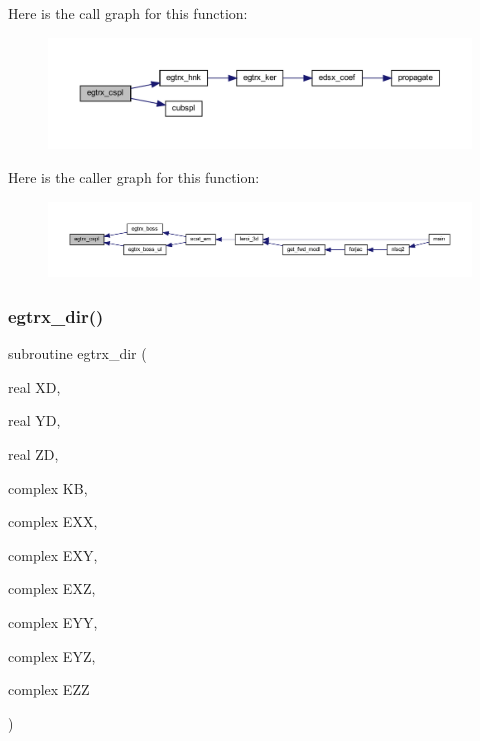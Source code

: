 Here is the call graph for this function\+:\nopagebreak
\begin{figure}[H]
\begin{center}
\leavevmode
\includegraphics[width=350pt]{Leroi_8f90_a10fd9ada0ec15151a8112666c09a245d_cgraph}
\end{center}
\end{figure}
Here is the caller graph for this function\+:\nopagebreak
\begin{figure}[H]
\begin{center}
\leavevmode
\includegraphics[width=350pt]{Leroi_8f90_a10fd9ada0ec15151a8112666c09a245d_icgraph}
\end{center}
\end{figure}
\mbox{\label{Leroi_8f90_a6bbebe0c58cc288fcd56628de8860916}} 
\subsubsection{\texorpdfstring{egtrx\+\_\+dir()}{egtrx\_dir()}}
{\footnotesize\ttfamily subroutine egtrx\+\_\+dir (\begin{DoxyParamCaption}\item[{real}]{XD,  }\item[{real}]{YD,  }\item[{real}]{ZD,  }\item[{complex}]{KB,  }\item[{complex}]{E\+XX,  }\item[{complex}]{E\+XY,  }\item[{complex}]{E\+XZ,  }\item[{complex}]{E\+YY,  }\item[{complex}]{E\+YZ,  }\item[{complex}]{E\+ZZ }\end{DoxyParamCaption})}


